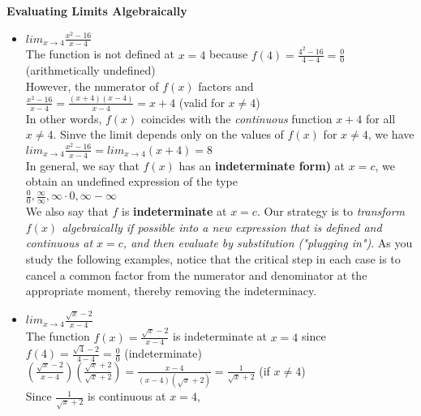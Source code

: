 \documentclass{article}
\begin{document}
	\textbf{Evaluating Limits Algebraically}
		\begin{itemize}
			\item $lim_{x \to 4}\frac{x^2 - 16}{x - 4}$\\
				The function is not defined at $x = 4$ because $f(4) = \frac{4^2 - 16}{4 - 4}  = \frac{0}{0}$ (arithmetically undefined)\\

				However, the numerator of $f(x)$ factors and\\
				$\frac{x^2 - 16}{x - 4} = \frac{(x+4)(x-4)}{x - 4} = x + 4$ (valid for $x \neq 4$)\\
				In other words, $f(x)$ coincides with the \textit{continuous} function $x + 4$ for all $x \neq 4$. Sinve the limit depends only on the values of $f(x)$ for $x \neq 4$, we have\\
				$lim_{x \to 4}\frac{x^2 - 16}{x - 4} = lim_{x \to 4}(x + 4) = 8$\\

				In general, we say that $f(x)$ has an \textbf{indeterminate form)} at $x = c$, we obtain an undefined expression of the type\\
				
				$\frac{0}{0}, \frac{\infty}{\infty}, \infty \cdot 0, \infty - \infty$\\

				We also say that $f$ is \textbf{indeterminate} at $x = c$. Our strategy is to \textit{transform $f(x)$ algebraically if possible into a new expression that is defined and continuous at $x = c$, and then evaluate by substitution ("plugging in")}. As you study the following examples, notice that the critical step in each case is to cancel a common factor from the numerator and denominator at the appropriate moment, thereby removing the indeterminacy.
			\item $lim_{x \to 4}\frac{\sqrt{x} - 2}{x - 4}$\\
				The function $f(x) = \frac{\sqrt{x} - 2}{x - 4}$ is indeterminate at $x = 4$ since\\

				$f(4) = \frac{\sqrt{4} - 2}{4 - 4} = \frac{0}{0}$ (indeterminate)\\

				$(\frac{\sqrt{x} - 2}{x - 4})(\frac{\sqrt{x} + 2}{\sqrt{x} + 2}) = \frac{x - 4}{(x - 4)(\sqrt{x} + 2)} = \frac{1}{\sqrt{x} + 2}$ (if $x \neq 4$)\\

				Since $\frac{1}{\sqrt{x} + 2}$ is continuous at $x = 4$,\\


\end{itemize}
\end{document}
